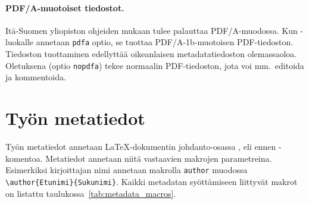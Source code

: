 \paragraph{PDF/A-muotoiset tiedostot.}

Itä-Suomen yliopiston ohjeiden mukaan  tulee palauttaa PDF/A-muodossa. Kun \uefcsthesis-luokalle annetaan \texttt{pdfa} optio, se tuottaa PDF/A-1b-muotoisen PDF-tiedoston. Tiedoston tuottaminen edellyttää oikeanlaisen metadatatiedoston olemassaoloa. Oletuksena (optio \texttt{nopdfa}) \uefcsthesis tekee normaalin PDF-tiedoston, jota voi mm.\ editoida ja kommentoida.


\section{Työn metatiedot}
\label{sec:latex:metadata}

Työn metatiedot annetaan \LaTeX-dokumentin johdanto-osassa , eli ennen \verb++-komentoa. Metatiedot annetaan niitä vastaavien makrojen parametreina. Esimerkiksi kirjoittajan nimi annetaan makrolla \texttt{author} muodossa \verb+\author{Etunimi}{Sukunimi}+. Kaikki metadatan syöttämiseen liittyvät makrot on listattu taulukossa~\ref{tab:metadata_macros}.

